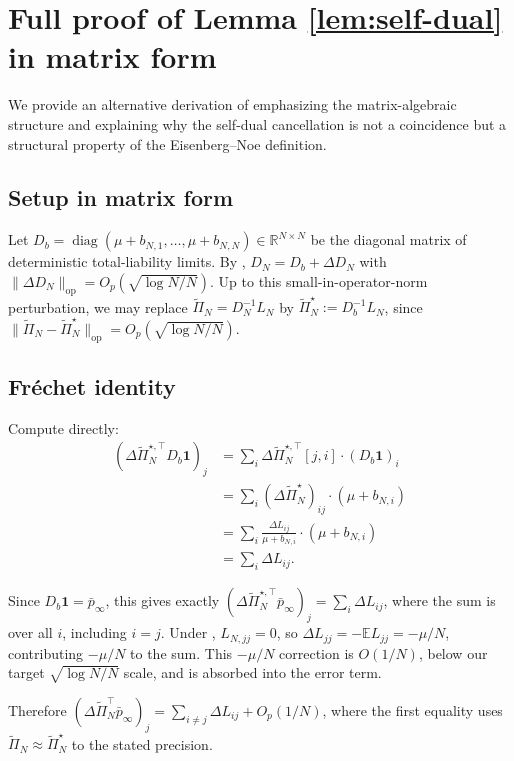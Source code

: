 \documentclass[11pt,a4paper]{article}
\theoremstyle{definition}
\newcommand{\DPi}{\Delta\widetilde{\Pi}}
\newcommand{\pbarinf}{{\bar p}_{\infty}}
\DeclareMathOperator{\diag}{diag}
\begin{document}
\appendix

\section{Full proof of Lemma \ref{lem:self-dual} in matrix form}
\label{app:self-dual-proof}

We provide an alternative derivation of  emphasizing
the matrix-algebraic structure and explaining why the self-dual cancellation
is not a coincidence but a structural property of the Eisenberg--Noe
definition.

\subsection*{Setup in matrix form}

Let $D_b = \diag(\mu+b_{N,1},\dots,\mu+b_{N,N})\in\mathbb{R}^{N\times N}$ be
the diagonal matrix of deterministic total-liability limits. By
, $D_N = D_b + \Delta D_N$ with
$\|\Delta D_N\|_{\mathrm{op}} = O_p(\sqrt{\log N/N})$. Up to this
small-in-operator-norm perturbation, we may replace
$\widetilde\Pi_N = D_N^{-1}L_N$ by $\widetilde\Pi_N^\star := D_b^{-1}L_N$,
since
$\|\widetilde\Pi_N - \widetilde\Pi_N^\star\|_{\mathrm{op}} = O_p(\sqrt{\log N/N})$.

\subsection*{Fr\'echet identity}

Compute directly:
\begin{align*}
(\DPi_N^{\star,\top}D_b\mathbf 1)_j
&= \sum_{i} \DPi_N^{\star,\top}[j,i]\cdot(D_b\mathbf 1)_i \\
&= \sum_{i}(\DPi_N^\star)_{ij}\cdot(\mu + b_{N,i}) \\
&= \sum_{i}\frac{\Delta L_{ij}}{\mu + b_{N,i}}\cdot(\mu + b_{N,i}) \\
&= \sum_{i}\Delta L_{ij}.
\end{align*}

Since $D_b\mathbf 1 = \pbarinf$, this gives exactly
$(\DPi_N^{\star,\top}\pbarinf)_j = \sum_i\Delta L_{ij}$, where the sum is
over all $i$, including $i = j$. Under , $L_{N,jj} = 0$, so
$\Delta L_{jj} = -\mathbb E L_{jj} = -\mu/N$, contributing
$-\mu/N$ to the sum. This $-\mu/N$ correction is $O(1/N)$, below our target
$\sqrt{\log N/N}$ scale, and is absorbed into the error term.

Therefore $(\DPi_N^\top\pbarinf)_j = \sum_{i\neq j}\Delta L_{ij} + O_p(1/N)$,
where the first equality uses $\widetilde\Pi_N \approx \widetilde\Pi_N^\star$
to the stated precision.
\end{document}
